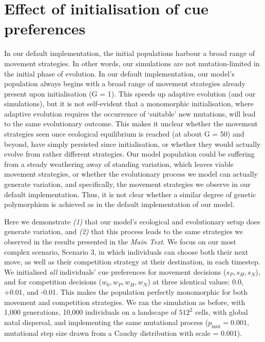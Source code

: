 \documentclass[]{article}
\begin{document}
\newpage

\hypertarget{effect-of-initialisation-of-cue-preferences}{%
\section{Effect of initialisation of cue preferences}\label{effect-of-initialisation-of-cue-preferences}}

In our default implementation, the initial populations harbour a broad range of movement strategies. In other words, our simulations are not mutation-limited in the initial phase of evolution.
In our default implementation, our model's population always begins with a broad range of movement strategies already present upon initialisation (G = 1).
This speeds up adaptive evolution (and our simulations), but it is not self-evident that a monomorphic initialisation, where adaptive evolution requires the occurrence of `suitable' new mutations, will lead to the same evolutionary outcome.
This makes it unclear whether the movement strategies seen once ecological equilibrium is reached (at about G = 50) and beyond, have simply persisted since initialisation, or whether they would actually evolve from rather different strategies.
Our model population could be suffering from a steady weathering away of standing variation, which leaves viable movement strategies, or whether the evolutionary process we model can actually generate variation, and specifically, the movement strategies we observe in our default implementation.
Thus, it is not clear whether a similar degree of genetic polymorphism is achieved as in the default implementation of our model.

Here we demonstrate \emph{(1)} that our model's ecological and evolutionary setup does generate variation, and \emph{(2)} that this process leads to the same strategies we observed in the results presented in the \emph{Main Text}.
We focus on our most complex scenario, Scenario 3, in which individuals can choose both their next move, as well as their competition strategy at their destination, in each timestep.
We initialised \emph{all} individuals' cue preferences for movement decisions (\(s_P, s_H, s_N\)), and for competition decisions (\(w_0, w_P, w_H, w_N\)) at three identical values: 0.0, +0.01, and -0.01.
This makes the population perfectly monomorphic for both movement and competition strategies.
We ran the simulation as before, with 1,000 generations, 10,000 individuals on a landscape of \(512^2\) cells, with global natal dispersal, and implementing the same mutational process (\(p_\text{mut} = 0.001\), mutational step size drawn from a Cauchy distribution with scale = 0.001).
\end{document}
